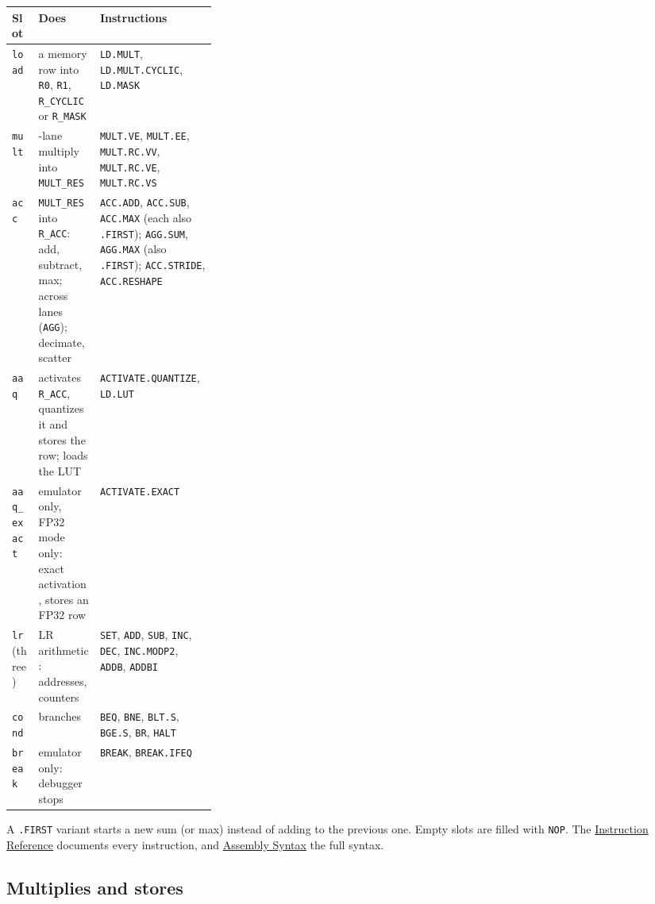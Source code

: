 \documentclass[11pt,a4paper]{article}
\newcommand{\doc}[2]{\href{https://rechefe.github.io/ipu-emulator/dev/#1/}{\textcolor{accent}{#2}}}
\begin{document}
\begin{center}
\small
\begin{tabularx}{\linewidth}{l>{\raggedright\arraybackslash}p{0.3\linewidth}>{\raggedright\arraybackslash}X}
\toprule
Slot & Does & Instructions \\
\midrule
\texttt{load} & a memory row into \texttt{R0}, \texttt{R1}, \texttt{R\_CYCLIC} or \texttt{R\_MASK} & \texttt{LD.MULT}, \texttt{LD.MULT.CYCLIC}, \texttt{LD.MASK} \\
\texttt{mult} & 128-lane multiply into \texttt{MULT\_RES} & \texttt{MULT.VE}, \texttt{MULT.EE}, \texttt{MULT.RC.VV}, \texttt{MULT.RC.VE}, \texttt{MULT.RC.VS} \\
\texttt{acc} & \texttt{MULT\_RES} into \texttt{R\_ACC}: add, subtract, max; across lanes (\texttt{AGG}); decimate, scatter & \texttt{ACC.ADD}, \texttt{ACC.SUB}, \texttt{ACC.MAX} (each also \texttt{.FIRST}); \texttt{AGG.SUM}, \texttt{AGG.MAX} (also \texttt{.FIRST}); \texttt{ACC.STRIDE}, \texttt{ACC.RESHAPE} \\
\texttt{aaq} & activates \texttt{R\_ACC}, quantizes it and stores the row; loads the LUT & \texttt{ACTIVATE.QUANTIZE}, \texttt{LD.LUT} \\
\texttt{aaq\_exact} & emulator only, FP32 mode only: exact activation, stores an FP32 row & \texttt{ACTIVATE.EXACT} \\
\texttt{lr} (three) & LR arithmetic: addresses, counters & \texttt{SET}, \texttt{ADD}, \texttt{SUB}, \texttt{INC}, \texttt{DEC}, \texttt{INC.MODP2}, \texttt{ADDB}, \texttt{ADDBI} \\
\texttt{cond} & branches & \texttt{BEQ}, \texttt{BNE}, \texttt{BLT.S}, \texttt{BGE.S}, \texttt{BR}, \texttt{HALT} \\
\texttt{break} & emulator only: debugger stops & \texttt{BREAK}, \texttt{BREAK.IFEQ} \\
\bottomrule
\end{tabularx}
\end{center}

A \texttt{.FIRST} variant starts a new sum (or max) instead of adding to the
previous one. Empty slots are filled with \texttt{NOP}.
The \doc{reference/isa/instructions}{Instruction Reference} documents every
instruction, and \doc{reference/isa/assembly-syntax}{Assembly Syntax} the
full syntax.

\needspace{6cm}
\subsection{Multiplies and stores}
\end{document}
